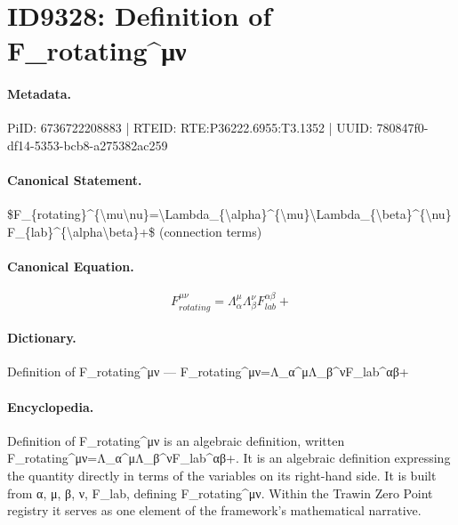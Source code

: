 \section*{ID9328: Definition of F\_rotating\textasciicircum{}μν}
\paragraph{Metadata.}
PiID: 6736722208883 | RTEID: RTE:P36222.6955:T3.1352 | UUID: 780847f0-df14-5353-bcb8-a275382ac259

\paragraph{Canonical Statement.}
\$F\_\{rotating\}\textasciicircum{}\{\textbackslash{}mu\textbackslash{}nu\}=\textbackslash{}Lambda\_\{\textbackslash{}alpha\}\textasciicircum{}\{\textbackslash{}mu\}\textbackslash{}Lambda\_\{\textbackslash{}beta\}\textasciicircum{}\{\textbackslash{}nu\}F\_\{lab\}\textasciicircum{}\{\textbackslash{}alpha\textbackslash{}beta\}+\$ (connection terms)

\paragraph{Canonical Equation.}
\[
F_{rotating}^{\mu\nu}=\Lambda_{\alpha}^{\mu}\Lambda_{\beta}^{\nu}F_{lab}^{\alpha\beta}+
\]

\paragraph{Dictionary.}
Definition of F\_rotating\textasciicircum{}μν — F\_rotating\textasciicircum{}μν=Λ\_α\textasciicircum{}μΛ\_β\textasciicircum{}νF\_lab\textasciicircum{}αβ+

\paragraph{Encyclopedia.}
Definition of F\_rotating\textasciicircum{}μν is an algebraic definition, written F\_rotating\textasciicircum{}μν=Λ\_α\textasciicircum{}μΛ\_β\textasciicircum{}νF\_lab\textasciicircum{}αβ+. It is an algebraic definition expressing the quantity directly in terms of the variables on its right-hand side. It is built from α, μ, β, ν, F\_lab, defining F\_rotating\textasciicircum{}μν. Within the Trawin Zero Point registry it serves as one element of the framework's mathematical narrative.
